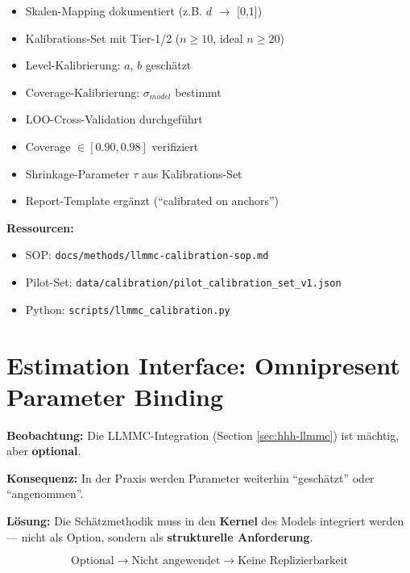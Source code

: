 \begin{tcolorbox}[colback=blue!5!white, colframe=blue!75!black,
    title=\textbf{Checkliste: Kalibrierung abgeschlossen}]

\begin{itemize}[nosep]
    \item[$\square$] Skalen-Mapping dokumentiert (z.B. $d$ $\rightarrow$ [0,1])
    \item[$\square$] Kalibrations-Set mit Tier-1/2 ($n \geq 10$, ideal $n \geq 20$)
    \item[$\square$] Level-Kalibrierung: $a$, $b$ geschätzt
    \item[$\square$] Coverage-Kalibrierung: $\sigma_{model}$ bestimmt
    \item[$\square$] LOO-Cross-Validation durchgeführt
    \item[$\square$] Coverage $\in [0.90, 0.98]$ verifiziert
    \item[$\square$] Shrinkage-Parameter $\tau$ aus Kalibrations-Set
    \item[$\square$] Report-Template ergänzt (``calibrated on anchors'')
\end{itemize}

\textbf{Ressourcen:}
\begin{itemize}[nosep]
    \item SOP: \texttt{docs/methods/llmmc-calibration-sop.md}
    \item Pilot-Set: \texttt{data/calibration/pilot\_calibration\_set\_v1.json}
    \item Python: \texttt{scripts/llmmc\_calibration.py}
\end{itemize}

\end{tcolorbox}


\section{Estimation Interface: Omnipresent Parameter Binding}
\label{sec:hhh-estimation-interface}

\begin{tcolorbox}[colback=red!5!white, colframe=red!75!black,
    title=\textbf{Das Problem: Optionale Methoden werden nicht angewendet}]

\textbf{Beobachtung:} Die LLMMC-Integration (Section \ref{sec:hhh-llmmc}) ist mächtig, aber \textbf{optional}.

\textbf{Konsequenz:} In der Praxis werden Parameter weiterhin ``geschätzt'' oder ``angenommen''.

\textbf{Lösung:} Die Schätzmethodik muss in den \textbf{Kernel} des Models integriert werden --- nicht als Option, sondern als \textbf{strukturelle Anforderung}.

\begin{equation*}
\boxed{\text{Optional} \rightarrow \text{Nicht angewendet} \rightarrow \text{Keine Replizierbarkeit}}
\end{equation*}

\end{tcolorbox}

